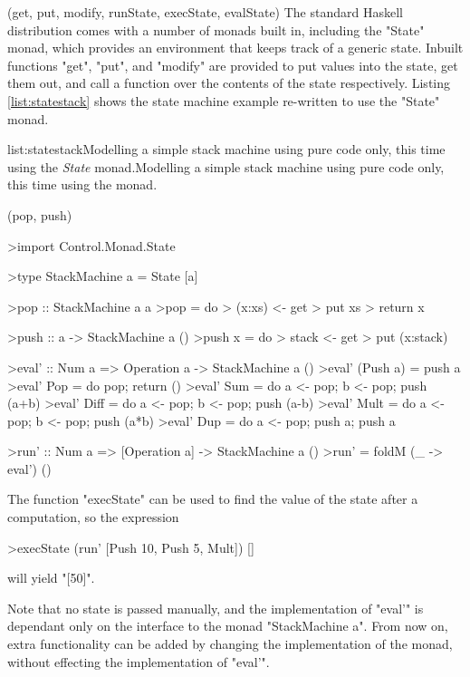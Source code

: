 \functions(get, put, modify, runState, execState, evalState)
The standard Haskell distribution comes with a number of monads built in, including the "State" monad, which provides an environment that keeps track of a generic state. Inbuilt functions "get", "put", and "modify" are provided to put values into the state, get them out, and call a function over the contents of the state respectively. Listing \ref{list:statestack} shows the state machine example re-written to use the "State" monad.

\vspace{-0.5em}
\begin{listing}{list:statestack}{Modelling a simple stack machine using pure code only, this time using the \emph{State} monad.}{Modelling a simple stack machine using pure code only, this time using the  monad.}{}
\end{listing}\vspace{-1.5em}

\functions(pop, push)
\begin{haskell}

>import Control.Monad.State

>type StackMachine a = State [a]

>pop :: StackMachine a a
>pop = do
>  (x:xs) <- get
>  put xs
>  return x

>push :: a -> StackMachine a ()
>push x = do
>  stack <- get
>  put (x:stack)

>eval' :: Num a => Operation a -> StackMachine a ()
>eval' (Push a) = push a
>eval' Pop  = do pop; return ()
>eval' Sum  = do a <- pop; b <- pop; push (a+b)
>eval' Diff = do a <- pop; b <- pop; push (a-b)
>eval' Mult = do a <- pop; b <- pop; push (a*b)
>eval' Dup  = do a <- pop; push a; push a

>run' :: Num a => [Operation a] -> StackMachine a ()
>run' = foldM (\_ -> eval') ()

\end{haskell}
\noindent The function "execState" can be used to find the value of the state after a computation, so the expression

\begin{haskell}

>execState (run' [Push 10, Push 5, Mult]) []

\end{haskell}
\noindent will yield "[50]".

Note that no state is passed manually, and the implementation of "eval'" is dependant only on the interface to the monad "StackMachine a". From now on, extra functionality can be added by changing the implementation of the monad, without effecting the implementation of "eval'". 

